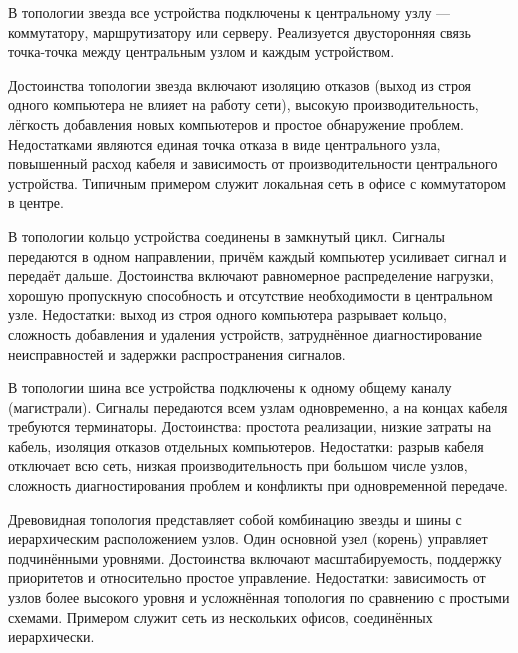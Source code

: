 \documentclass{SibFU-docs}
\begin{document}

В топологии звезда все устройства подключены к центральному узлу --- коммутатору, маршрутизатору или серверу. Реализуется двусторонняя связь точка-точка между центральным узлом и каждым устройством.

Достоинства топологии звезда включают изоляцию отказов (выход из строя одного компьютера не влияет на работу сети), высокую производительность, лёгкость добавления новых компьютеров и простое обнаружение проблем. Недостатками являются единая точка отказа в виде центрального узла, повышенный расход кабеля и зависимость от производительности центрального устройства. Типичным примером служит локальная сеть в офисе с коммутатором в центре.


В топологии кольцо устройства соединены в замкнутый цикл. Сигналы передаются в одном направлении, причём каждый компьютер усиливает сигнал и передаёт дальше. Достоинства включают равномерное распределение нагрузки, хорошую пропускную способность и отсутствие необходимости в центральном узле. Недостатки: выход из строя одного компьютера разрывает кольцо, сложность добавления и удаления устройств, затруднённое диагностирование неисправностей и задержки распространения сигналов.


В топологии шина все устройства подключены к одному общему каналу (магистрали). Сигналы передаются всем узлам одновременно, а на концах кабеля требуются терминаторы. Достоинства: простота реализации, низкие затраты на кабель, изоляция отказов отдельных компьютеров. Недостатки: разрыв кабеля отключает всю сеть, низкая производительность при большом числе узлов, сложность диагностирования проблем и конфликты при одновременной передаче.


Древовидная топология представляет собой комбинацию звезды и шины с иерархическим расположением узлов. Один основной узел (корень) управляет подчинёнными уровнями. Достоинства включают масштабируемость, поддержку приоритетов и относительно простое управление. Недостатки: зависимость от узлов более высокого уровня и усложнённая топология по сравнению с простыми схемами. Примером служит сеть из нескольких офисов, соединённых иерархически.

\end{document}

